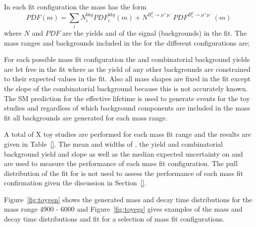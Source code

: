 {In each fit configuration the mass \pdf has the form
\begin{equation}
PDF(m) = \displaystyle\sum_{i} N^{bkg}_{i}PDF^{bkg}_{i}(m) + N^{B^{0}_{s} \to \mu^{+} \mu^{-}}PDF^{B^{0}_{s} \to \mu^{+} \mu^{-}}(m)
\end{equation}
where $N$ and $PDF$ are the yields and \pdfs of the signal (backgrounds) in the fit. The mass ranges and backgrounds included in the \pdf for the different configurations are;


For each possible mass fit configuration the \bsmumu and combinatorial background yields are let free in the fit where as the yield of any other backgrounds are constrained to their expected values in the fit. Also all mass shapes are fixed in the \ml fit except the slope of the combinatorial background because this is not accurately known.
The SM prediction for the \bsmumu effective lifetime is used to generate events for the toy studies and regardless of which background components are included in the mass fit all backgrounds are generated for each mass range. 

A total of X toy studies are performed for each mass fit range and the results are given in Table~\ref{}. The mean and widths of \Gmumu, the \bsmumu yield and combinatorial background yield and slope as well as the median expected uncertainty on \tmumu and \Gmumu are used to measure the performance of each mass fit configuration. The pull distribution of the fit for \tmumu is not used to assess the performance of each mass fit confirmation given the discussion in Section~\ref{}.

Figure~\ref{fig:toygen} shows the generated mass and decay time distributions for the mass range 4900 - 6000 and Figure~\ref{fig:toyegs} gives examples of the mass and decay time distributions and \ml fit for a selection of mass fit configurations. 

}
